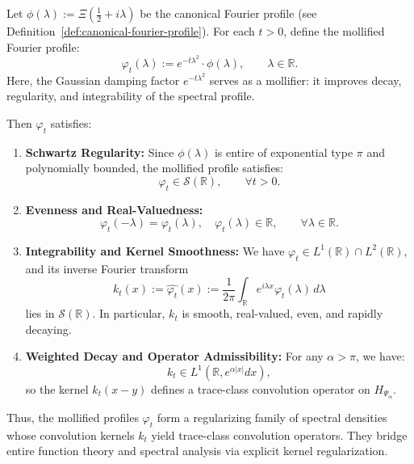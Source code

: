 \begin{definition}
\label{def:mollified-fourier-profile}
Let \( \phi(\lambda) := \Xi\left( \tfrac{1}{2} + i\lambda \right) \) be the canonical Fourier profile (see Definition~\ref{def:canonical-fourier-profile}). For each \( t > 0 \), define the mollified Fourier profile:
\[
\varphi_t(\lambda) := e^{-t\lambda^2} \cdot \phi(\lambda), \qquad \lambda \in \mathbb{R}.
\]
Here, the Gaussian damping factor \( e^{-t\lambda^2} \) serves as a mollifier: it improves decay, regularity, and integrability of the spectral profile.

Then \( \varphi_t \) satisfies:
\begin{enumerate}
  \item \textbf{Schwartz Regularity:} Since \( \phi(\lambda) \) is entire of exponential type \( \pi \) and polynomially bounded, the mollified profile satisfies:
  \[
  \varphi_t \in \mathcal{S}(\mathbb{R}), \qquad \forall t > 0.
  \]

  \item \textbf{Evenness and Real-Valuedness:}
  \[
  \varphi_t(-\lambda) = \varphi_t(\lambda), \quad \varphi_t(\lambda) \in \mathbb{R}, \qquad \forall \lambda \in \mathbb{R}.
  \]

  \item \textbf{Integrability and Kernel Smoothness:} We have \( \varphi_t \in L^1(\mathbb{R}) \cap L^2(\mathbb{R}) \), and its inverse Fourier transform
  \[
  k_t(x) := \widehat{\varphi_t}(x) := \frac{1}{2\pi} \int_{\mathbb{R}} e^{i\lambda x} \varphi_t(\lambda)\, d\lambda
  \]
  lies in \( \mathcal{S}(\mathbb{R}) \). In particular, \( k_t \) is smooth, real-valued, even, and rapidly decaying.

  \item \textbf{Weighted Decay and Operator Admissibility:} For any \( \alpha > \pi \), we have:
  \[
  k_t \in L^1(\mathbb{R}, e^{\alpha|x|} dx),
  \]
  so the kernel \( k_t(x - y) \) defines a trace-class convolution operator on \( H_{\Psi_\alpha} \).
\end{enumerate}

\noindent
Thus, the mollified profiles \( \varphi_t \) form a regularizing family of spectral densities whose convolution kernels \( k_t \) yield trace-class convolution operators. They bridge entire function theory and spectral analysis via explicit kernel regularization.
\end{definition}
